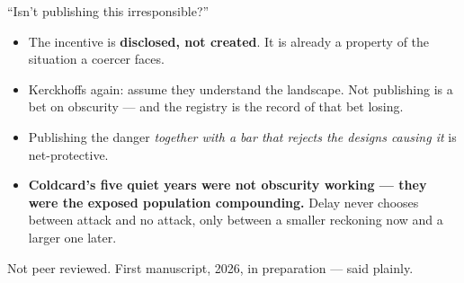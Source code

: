 \documentclass[aspectratio=169,12pt]{beamer}
\newcommand{\punch}[1]{{\color{accentdark}\bfseries #1}}
\begin{document}
\begin{frame}[t]{``Isn't publishing this irresponsible?''}
  \vspace{0.61em}
  \begin{itemize}\setlength\itemsep{0.56em}
    \item {\small The incentive is \punch{disclosed, not created}. It is already a
      property of the situation a coercer faces.}
    \item {\small Kerckhoffs again: assume they understand the landscape. Not
      publishing is a bet on obscurity --- and the registry is the record of that
      bet losing.}
    \item {\small Publishing the danger \emph{together with a bar that rejects the
      designs causing it} is net-protective.}
    \item {\small \punch{Coldcard's five quiet years were not obscurity working ---
      they were the exposed population compounding.} Delay never chooses between
      attack and no attack, only between a smaller reckoning now and a larger one
      later.}
  \end{itemize}
  \vfill
  {\footnotesize\color{graytext}
   Not peer reviewed. First manuscript, 2026, in preparation --- said plainly.}
  \vspace{0.17em}
\end{frame}
\end{document}
